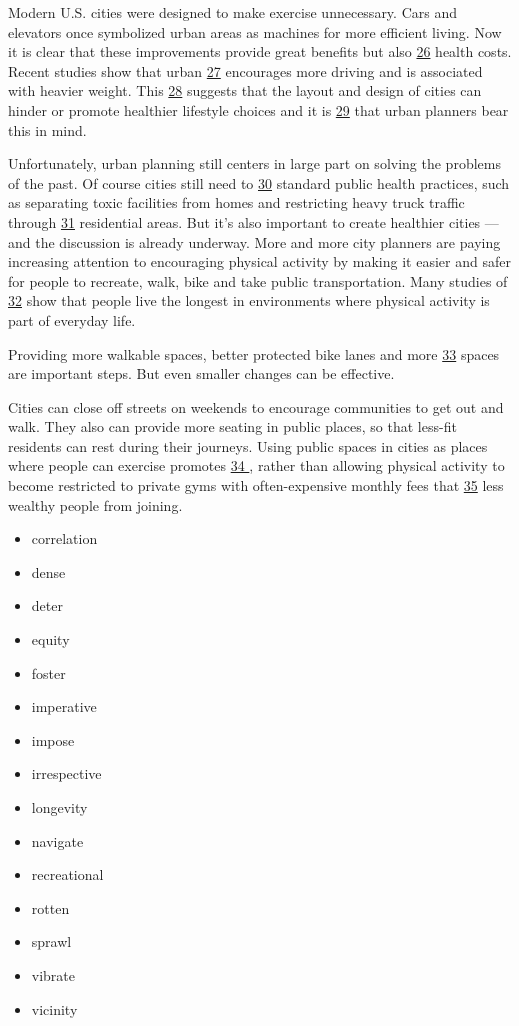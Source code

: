 \documentclass[UTF8,11pt]{ctexart}
\begin{document}
Modern U.S. cities were designed to make exercise unnecessary. Cars and elevators once symbolized urban areas as machines for more efficient living. Now it is clear that these improvements provide great benefits but also \uline{26} health costs. Recent studies show that urban \uline{27} encourages more driving and is associated with heavier weight. This \uline{28} suggests that the layout and design of cities can hinder or promote healthier lifestyle choices and it is \uline{29} that urban planners bear this in mind.


Unfortunately, urban planning still centers in large part on solving the problems of the past. Of course cities still need to \uline{30} standard public health practices, such as separating toxic facilities from homes and restricting heavy truck traffic through \uline{31} residential areas. But it’s also important to create healthier cities — and the discussion is already underway. More and more city planners are paying increasing attention to encouraging physical activity by making it easier and safer for people to recreate, walk, bike and take public transportation. Many studies of \uline{32} show that people live the longest in environments where physical activity is part of everyday life.


Providing more walkable spaces, better protected bike lanes and more \uline{33} spaces are important steps. But even smaller changes can be effective.


Cities can close off streets on weekends to encourage communities to get out and walk. They also can provide more seating in public places, so that less-fit residents can rest during their journeys. Using public spaces in cities as places where people can exercise promotes \uline{34 }, rather than allowing physical activity to become restricted to private gyms with often-expensive monthly fees that \uline{35} less wealthy people from joining.


\begin{itemize}[leftmargin=2em,itemsep=.2em,topsep=.4em]\item[A.] correlation
\item[B.] dense
\item[C.] deter
\item[D.] equity
\item[E.] foster
\item[F.] imperative
\item[G.] impose
\item[H.] irrespective
\item[I.] longevity
\item[J.] navigate
\item[K.] recreational
\item[L.] rotten
\item[M.] sprawl
\item[N.] vibrate
\item[O.] vicinity
\end{itemize}
\end{document}
